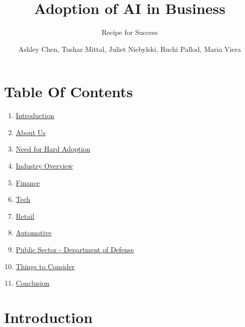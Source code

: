 \documentclass[
]{article}
\title{Adoption of AI in Business}
\subtitle{Recipe for Success}
\author{Ashley Chen, Tushar Mittal, Juliet Niebylski, Ruchi Pallod, Maria Viera}
\date{}
\providecommand{\tightlist}{%
  \setlength{\itemsep}{0pt}\setlength{\parskip}{0pt}}
\begin{document}
\maketitle

{
\setcounter{tocdepth}{2}
\tableofcontents
}
\hypertarget{table-of-contents}{%
\section*{Table Of Contents}\label{table-of-contents}}

\begin{enumerate}
\def\labelenumi{\arabic{enumi}.}
\tightlist
\item
  \href{https://tmittala.github.io/Recipe_for_Success/introduction.html}{Introduction}
\item
  \href{https://tmittala.github.io/Recipe_for_Success/about-us.html}{About Us}
\item
  \href{https://tmittala.github.io/Recipe_for_Success/need-for-hard-adoption.html}{Need for Hard Adoption}
\item
  \href{https://tmittala.github.io/Recipe_for_Success/industry-overview.html}{Industry Overview}
\item
  \href{https://tmittala.github.io/Recipe_for_Success/finance.html}{Finance}
\item
  \href{https://tmittala.github.io/Recipe_for_Success/tech.html}{Tech}
\item
  \href{https://tmittala.github.io/Recipe_for_Success/retail.html}{Retail}
\item
  \href{https://tmittala.github.io/Recipe_for_Success/automotive.html}{Automotive}
\item
  \href{https://tmittala.github.io/Recipe_for_Success/public-sector---department-of-defense.html}{Public Sector - Department of Defense}
\item
  \href{https://tmittala.github.io/Recipe_for_Success/things-to-consider.html}{Things to Consider}
\item
  \href{https://tmittala.github.io/Recipe_for_Success/conclusion-1.html}{Conclusion}
\end{enumerate}

\hypertarget{introduction}{%
\section*{Introduction}\label{introduction}}
\end{document}
